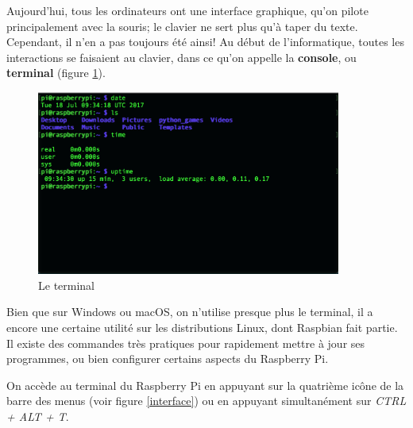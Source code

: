 Aujourd'hui, tous les ordinateurs ont une interface graphique, qu'on pilote principalement avec la souris; le clavier ne sert plus qu'à taper du texte. Cependant, il n'en a pas toujours été ainsi! Au début de l'informatique, toutes les interactions se faisaient au clavier, dans ce qu'on appelle la \textbf{console}, ou \textbf{terminal} (figure \ref{terminal}).

\begin{figure}[h!]
\begin{center}
\includegraphics[width=10cm]{img/ssh.png}
\end{center}
\caption{Le terminal}
\label{terminal}
\end{figure}

Bien que sur Windows ou macOS, on n'utilise presque plus le terminal, il a encore une certaine utilité sur les distributions Linux, dont Raspbian fait partie.
Il existe des commandes très pratiques pour rapidement mettre à jour ses programmes, ou bien configurer certains aspects du Raspberry Pi.

On accède au terminal du Raspberry Pi en appuyant sur la quatrième icône de la barre des menus (voir figure \ref{interface}) ou en appuyant simultanément sur \textit{CTRL + ALT + T}.